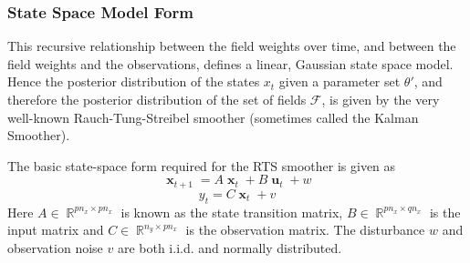 \documentclass{IEEEtran}
\DeclareMathOperator{\R}{\mathbb{R}}
\DeclareMathOperator{\xvec}{\mathbf{x}}
\DeclareMathOperator{\uvec}{\mathbf{u}}
\begin{document}
\subsubsection{State Space Model Form}

This recursive relationship between the field weights over time, and between the field weights and the observations, defines a linear, Gaussian state space model. Hence the posterior distribution of the states $x_t$ given a parameter set $\theta'$, and therefore the posterior distribution of the set of fields $\mathcal{F}$, is given by the very well-known Rauch-Tung-Streibel smoother (sometimes called the Kalman Smoother).

The basic state-space form required for the RTS smoother is given as
\begin{equation}
	\label{eqn:ssmodel_hidden}
	\xvec_{t+1} = A\xvec_t + B\uvec_t + w
\end{equation}
\begin{equation}
	\label{eqn:ssmodel_observations}
	y_t = C\xvec_t + v
\end{equation}
Here $A \in \R^{pn_{x} \times pn_x}$ is known as the state transition matrix, $B \in \R^{pn_x \times qn_x}$ is the input matrix and $C \in \R^{n_y \times pn_x}$ is the observation matrix. The disturbance $w$ and observation noise $v$ are both i.i.d. and normally distributed. 
\end{document}
